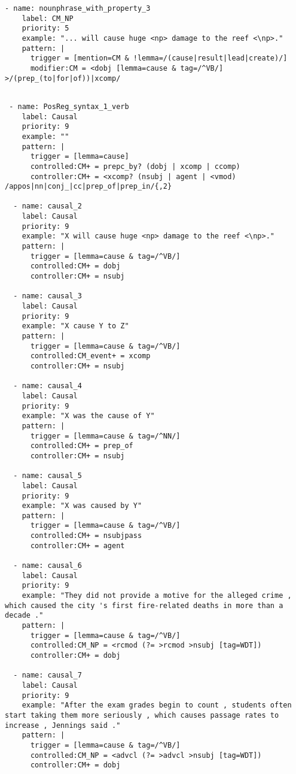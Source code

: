 \begin{singlespace}
\begin{small}
\begin{lstlisting}[caption={Rules for extracting causal mentions (CMs), which are the potential arguments for causal events.}]
  - name: nounphrase_with_property_3
    label: CM_NP
    priority: 5
    example: "... will cause huge <np> damage to the reef <\np>."
    pattern: |
      trigger = [mention=CM & !lemma=/(cause|result|lead|create)/]
      modifier:CM = <dobj [lemma=cause & tag=/^VB/] >/(prep_(to|for|of))|xcomp/
\end{lstlisting}

\begin{lstlisting}[caption={Rules for causal relations (events).  Note that the cause and effect arguments are previously found causal mentions.}] 

 - name: PosReg_syntax_1_verb
    label: Causal    
    priority: 9
    example: ""
    pattern: |
      trigger = [lemma=cause]
      controlled:CM+ = prepc_by? (dobj | xcomp | ccomp) 
      controller:CM+ = <xcomp? (nsubj | agent | <vmod) /appos|nn|conj_|cc|prep_of|prep_in/{,2}

  - name: causal_2
    label: Causal
    priority: 9
    example: "X will cause huge <np> damage to the reef <\np>."
    pattern: |
      trigger = [lemma=cause & tag=/^VB/]
      controlled:CM+ = dobj 
      controller:CM+ = nsubj

  - name: causal_3
    label: Causal
    priority: 9
    example: "X cause Y to Z"
    pattern: |
      trigger = [lemma=cause & tag=/^VB/]
      controlled:CM_event+ = xcomp 
      controller:CM+ = nsubj

  - name: causal_4
    label: Causal
    priority: 9
    example: "X was the cause of Y"
    pattern: |
      trigger = [lemma=cause & tag=/^NN/]
      controlled:CM+ = prep_of
      controller:CM+ = nsubj

  - name: causal_5
    label: Causal
    priority: 9
    example: "X was caused by Y"
    pattern: |
      trigger = [lemma=cause & tag=/^VB/]
      controlled:CM+ = nsubjpass
      controller:CM+ = agent

  - name: causal_6
    label: Causal
    priority: 9
    example: "They did not provide a motive for the alleged crime , which caused the city 's first fire-related deaths in more than a decade ."
    pattern: |
      trigger = [lemma=cause & tag=/^VB/]
      controlled:CM_NP = <rcmod (?= >rcmod >nsubj [tag=WDT])
      controller:CM+ = dobj

  - name: causal_7
    label: Causal
    priority: 9
    example: "After the exam grades begin to count , students often start taking them more seriously , which causes passage rates to increase , Jennings said ."
    pattern: |
      trigger = [lemma=cause & tag=/^VB/]
      controlled:CM_NP = <advcl (?= >advcl >nsubj [tag=WDT])
      controller:CM+ = dobj



\end{lstlisting}
\end{small}
\end{singlespace}
